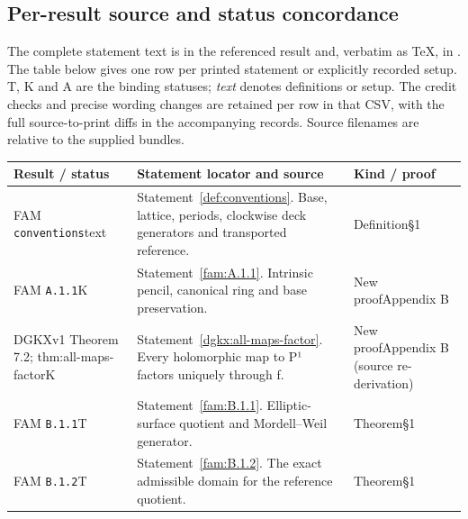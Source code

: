 \documentclass[11pt,a4paper]{article}
\theoremstyle{plain}
\theoremstyle{definition}
\begin{document}
\subsection{Per-result source and status concordance}\label{app:source-status}
The complete statement text is in the referenced result and, verbatim as TeX, in . The table below gives one row per printed statement or explicitly recorded setup. T, K and A are the binding statuses; \emph{text} denotes definitions or setup. The credit checks and precise wording changes are retained per row in that CSV, with the full source-to-print diffs in the accompanying records. Source filenames are relative to the supplied bundles.
\begingroup\small\setlength{\tabcolsep}{3pt}
\begin{longtable}{@{}L{.18\linewidth}L{.48\linewidth}L{.29\linewidth}@{}}
\toprule Result / status & Statement locator and source & Kind / proof\\\midrule\endhead
FAM \nolinkurl{conventions}\newline text & Statement~\ref{def:conventions}. Base, lattice, periods, clockwise deck generators and transported reference.\newline {} & Definition\newline §1\\
FAM \nolinkurl{A.1.1}\newline K & Statement~\ref{fam:A.1.1}. Intrinsic pencil, canonical ring and base preservation.\newline {} & New proof\newline Appendix B\\
DGKXv1 Theorem 7.2; thm:\allowbreak{}all-maps-factor\newline K & Statement~\ref{dgkx:all-maps-factor}. Every holomorphic map to P¹ factors uniquely through f.\newline {} & New proof\newline Appendix B (source re-derivation)\\
FAM \nolinkurl{B.1.1}\newline T & Statement~\ref{fam:B.1.1}. Elliptic-surface quotient and Mordell--Weil generator.\newline {} & Theorem\newline §1\\
FAM \nolinkurl{B.1.2}\newline T & Statement~\ref{fam:B.1.2}. The exact admissible domain for the reference quotient.\newline {} & Theorem\newline §1\\

\end{longtable}
\end{document}
